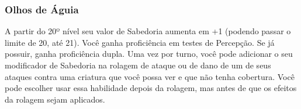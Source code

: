 \documentclass[letterpaper,twocolumn,openany]{dndbook}
\begin{document}
	\subsubsection{Olhos de Águia}
	A partir do 20º nível seu valor de Sabedoria aumenta em +1 (podendo passar o limite de 20, até 21).
	Você ganha proficiência em testes de Percepção. Se já possuir, ganha proficiência dupla.
	Uma vez por turno, você pode adicionar o seu modificador de Sabedoria na rolagem de ataque ou de dano de um de seus ataques contra uma criatura que você possa ver e que não tenha cobertura.
	Você pode escolher usar essa habilidade depois da rolagem, mas antes de que os efeitos da rolagem sejam aplicados.
	
	
\end{document}

